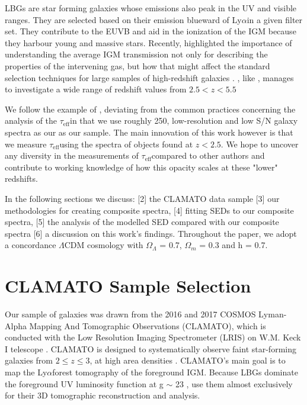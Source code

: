 \documentclass[preprint2,times,tighten]{aastex6}
\newcommand{\teff}{$\tau_\mathrm{eff}$\space}
\newcommand{\lya}{Ly$\alpha$\space}
\begin{document}
LBGs are star forming galaxies whose emissions also peak in the UV and visible ranges. They are selected based on their emission blueward of \lya in a given filter set. They contribute to the EUVB and aid in the ionization of the IGM because they harbour young and massive stars. Recently, \cite{thomas_vimos_2017} highlighted the importance of understanding the average IGM transmission not only for describing the properties of the intervening gas, but how that might affect the standard selection techniques for large samples of high-redshift galaxies \citep{steidel_spectroscopic_1996}.
\cite{thomas_vimos_2017}, like \cite{faucher-giguere_direct_2008, becker_refined_2013}, manages to investigate a wide range of redshift values from $2.5 < z < 5.5$ 

We follow the example of \cite{thomas_vimos_2017}, deviating from the common practices concerning the analysis of the \teff in that we use roughly 250, low-resolution and low S/N galaxy spectra as our as our sample. The main innovation of this work however is that we measure \teff using the spectra of objects found at $z < 2.5$. We hope to uncover any diversity in the measurements of \teff compared to other authors and contribute to working knowledge of how this opacity scales at these "lower" redshifts.

In the following sections we discuss: [2] the CLAMATO data sample [3] our methodologies for creating composite spectra, [4] fitting SEDs to our composite spectra, [5] the analysis of the modelled SED compared with our composite spectra [6] a discussion on this work’s findings. Throughout the paper, we adopt a concordance $\Lambda$CDM cosmology with $\Omega_{\Lambda}$ = 0.7, $\Omega_{m}$ = 0.3 and h = 0.7.


\section{CLAMATO Sample Selection}
\label{sec:selection}

Our sample of galaxies was drawn from the 2016 and 2017 COSMOS Lyman-Alpha Mapping And Tomographic Observations (CLAMATO), which is conducted with the Low Resolution Imaging Spectrometer (LRIS) on W.M. Keck I telescope \citep{LRIS}. CLAMATO is designed to systematically observe faint star-forming galaxies from $2 \leq z \leq 3$, at high area densities \citep{lee_first_2018, lee_observational_2014}. CLAMATO's main goal is to map the \lya forest tomography of the foreground IGM. Because LBGs dominate the foreground UV luminosity function at g $\sim$ 23 \citep{reddy_multi-wavelength_2008}, \cite{lee_observational_2014} use them almost exclusively for their 3D tomographic reconstruction and analysis.
\end{document}

